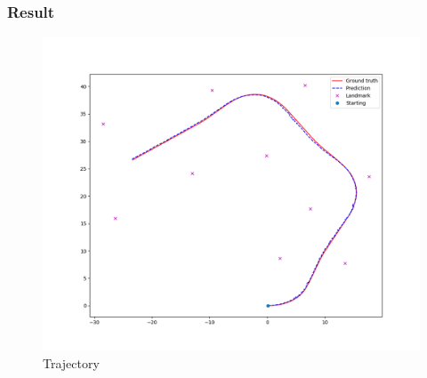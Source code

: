 \documentclass{article}
\begin{document}
\subsubsection{Result} 
\begin{figure}[h]
\centering
\includegraphics[width=\textwidth]{../particle-max.png}
\caption{Trajectory}\label{fig:image-1}
\end{figure}
\end{document}
